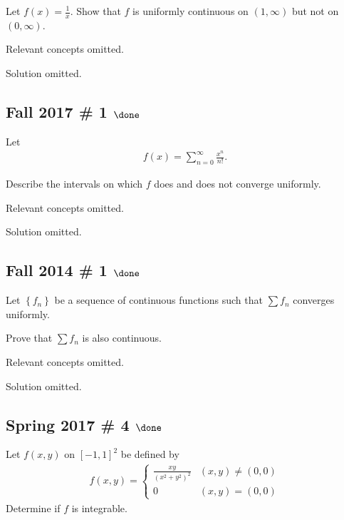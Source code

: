 Let \(f(x) = \frac 1 x\). Show that \(f\) is uniformly continuous on
\((1, \infty)\) but not on \((0,\infty)\).

Relevant concepts omitted.

Solution omitted.

\hypertarget{fall-2017-1-done}{%
\subsection{\texorpdfstring{Fall 2017 \# 1
\(\done\)}{Fall 2017 \# 1 \textbackslash done}}\label{fall-2017-1-done}}

Let
\begin{align*}
f(x) = \sum _{n=0}^{\infty} \frac{x^{n}}{n !}.
\end{align*}

Describe the intervals on which \(f\) does and does not converge
uniformly.

Relevant concepts omitted.

Solution omitted.

\hypertarget{fall-2014-1-done}{%
\subsection{\texorpdfstring{Fall 2014 \# 1
\(\done\)}{Fall 2014 \# 1 \textbackslash done}}\label{fall-2014-1-done}}

Let \(\left\{{f_n}\right\}\) be a sequence of continuous functions such
that \(\sum f_n\) converges uniformly.

Prove that \(\sum f_n\) is also continuous.

\envlist

Relevant concepts omitted.

Solution omitted.

\hypertarget{spring-2017-4-done}{%
\subsection{\texorpdfstring{Spring 2017 \# 4
\(\done\)}{Spring 2017 \# 4 \textbackslash done}}\label{spring-2017-4-done}}

Let \(f(x, y)\) on \([-1, 1]^2\) be defined by
\begin{align*}
f(x, y) = \begin{cases}
\frac{x y}{\left(x^{2}+y^{2}\right)^{2}} & (x, y) \neq (0, 0) \\
0 & (x, y) = (0, 0)
\end{cases}
\end{align*}
Determine if \(f\) is integrable.

